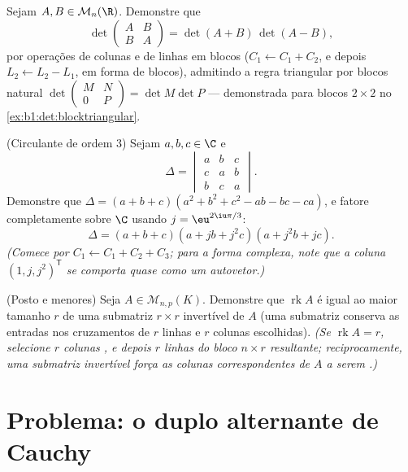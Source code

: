 \begin{exercise}[$\star\star\star$]\label{exo:b1:det:10}
Sejam $A, B \in \mathcal{M}_n(\R)$. Demonstre que
\[
\det\begin{pmatrix} A & B\\ B & A \end{pmatrix}
= \det(A + B)\,\det(A - B),
\]
por operações de colunas e de linhas em blocos ($C_1 \leftarrow C_1 + C_2$, e depois
$L_2 \leftarrow L_2 - L_1$, em forma de blocos), admitindo a regra triangular por blocos
natural $\det\begin{pmatrix} M & N\\ 0 &
P\end{pmatrix} = \det M \det P$ --- demonstrada para blocos $2 \times 2$ no \cref{ex:b1:det:blocktriangular}.
\end{exercise}

\begin{exercise}[$\star\star$]\label{exo:b1:det:11}
(Circulante de ordem $3$) Sejam $a, b, c \in \C$ e
\[
\Delta = \begin{vmatrix}
a & b & c\\
c & a & b\\
b & c & a
\end{vmatrix}.
\]
Demonstre que $\Delta = (a + b + c)(a^2 + b^2 + c^2 - ab - bc -
ca)$, e fatore completamente sobre $\C$ usando $j =
\eu^{2\iu\pi/3}$:
\[
\Delta = (a + b + c)(a + jb + j^2c)(a + j^2b + jc) .
\]
\emph{(Comece por $C_1 \leftarrow C_1 + C_2 + C_3$; para a forma complexa, note que a coluna
$(1, j, j^2)^{\mathsf T}$ se comporta quase como um autovetor.)}
\end{exercise}

\begin{exercise}[$\star\star\star$]\label{exo:b1:det:12}
(Posto e menores) Seja $A \in \mathcal{M}_{n,p}(K)$. Demonstre que $\operatorname{rk} A$ é igual ao maior
tamanho $r$ de uma submatriz $r \times r$ invertível de $A$ (uma submatriz
conserva as entradas nos cruzamentos de $r$ linhas e $r$ colunas
escolhidas). \emph{(Se $\operatorname{rk} A = r$, selecione $r$ colunas , e depois
$r$ linhas  do bloco $n \times r$ resultante; reciprocamente, uma
submatriz invertível força as colunas correspondentes de $A$ a serem
.)}
\end{exercise}

\section{Problema: o duplo alternante de Cauchy}

